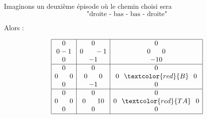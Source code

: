 \documentclass{beamer}
\begin{document}
\begin{frame}
Imaginons un deuxième épisode où le chemin choisi sera $$\text{"droite - bas - bas - droite"}$$ 

Alors : \pause

\begin{figure}[!ht]
\centering
$$\begin{array}{|c|c|c|}
\hline
0                      & 0                           & 0 \\
0 -1 & 0 \hspace*{0.6cm} -1 & 0\hspace*{0.6cm}0 \\
0          & -1          & -10 \\
\hline
0          & 0                            & 0 \\
0\hspace*{0.6cm}0   & 0\hspace*{0.6cm} 0                  & 0\hspace*{0.25cm}\textcolor{red}{B}\hspace*{0.25cm} 0 \\
0           & -1          & 0 \\
\hline
0          & 0                         & 0\\
0\hspace*{0.6cm} 0                     & 0\hspace*{0.6cm}10                & 0\hspace*{0.25cm}\textcolor{red}{T A}\hspace*{0.25cm} 0 \\
0                            & 0        & 0 \\
\hline
\end{array}
$$
\end{figure}
\end{frame}
\end{document}
